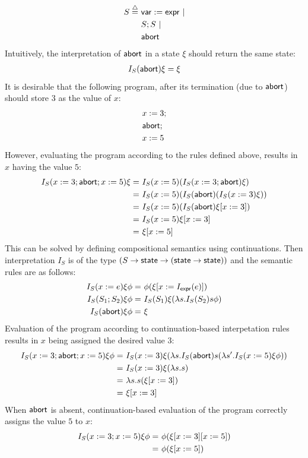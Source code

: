 \begin{example}
\begin{align}
S  \stackrel{{\scriptstyle\triangle}}{=} \ & \mathsf{var} := \mathsf{expr} \ | \notag \\
& S;S \ | \notag \\
& \mathsf{abort} \notag
\end{align}
Intuitively, the interpretation of $\mathsf{abort}$ in a state $\xi$ should return the same state:
\begin{align}
I_{S}(\mathsf{abort})\xi = \xi \notag
\end{align}
It is desirable that the following program, after its termination (due to $\mathsf{abort}$) should store $3$ as the value of $x$:
\begin{align*}
& x:= 3; \notag \\
& \mathsf{abort}; \notag \\
& x:= 5 \notag
\end{align*}
However, evaluating the program according to the rules defined above, 
results in $x$ having the value $5$:
\begin{align}
I_S(x:=3;\mathsf{abort}; x:=5)\xi  = \ & I_S(x:=5)(I_S(x:=3; \mathsf{abort})\xi ) \notag \\
= \ & I_S(x:=5)(I_S(\mathsf{abort})(I_S(x:=3) \xi)) \notag \\
= \ & I_S(x:=5)(I_S(\mathsf{abort}) \xi [ x:=3 ] )  \notag \\
= \ & I_S(x:=5) \xi [  x:=3 ] \notag \\
= \ & \xi [ x:=5] \notag
\end{align}
This can be solved by defining compositional semantics using continuations. Then interpretation $I_S$ is of the type $(S \rightarrow \mathsf{state} \rightarrow (\mathsf{state} \rightarrow \mathsf{state}))$ and the semantic rules are as follows:
\begin{align}
I_{S}(x:=e) \xi \phi = \ & \phi(\xi [ x:=I_{\mathsf{expr}}(e)]) \notag \\
I_{S}(S_1;S_2)\xi \phi = \ &  I_S(S_1)\xi(\lambda s.I_{S}(S_2)s \phi) \notag \\
I_{S}(\mathsf{abort}) \xi \phi = \ &\xi \notag
\end{align}
Evaluation of the program according to continuation-based interpetation rules results in $x$ being assigned the desired value $3$:
\begin{align}
I_{S}(x:=3; \mathsf{abort}; x:=5) \xi \phi  = \ & I_{S}(x:=3) \xi ( \lambda s. I_{S}(\mathsf{abort}) s ( \lambda s'. I_{S}(x:=5) \xi \phi )) \notag \\
= \ & I_{S}(x:=3) \xi (\lambda s.s) \notag \\
= \ & \lambda s.s (\xi [x:=3] )  \notag \\
= \ & \xi [x:=3] \notag
\end{align}
When $\mathsf{abort}$ is absent, continuation-based evaluation of the program  correctly assigns the value $5$ to $x$:
\begin{align}
I_{S}(x:=3; x:=5) \xi \phi = \ & \phi(\xi[x:=3][x:=5]) \notag \\
= \ & \phi (\xi [x:=5]) \notag
\end{align} \qex
\end{example}

